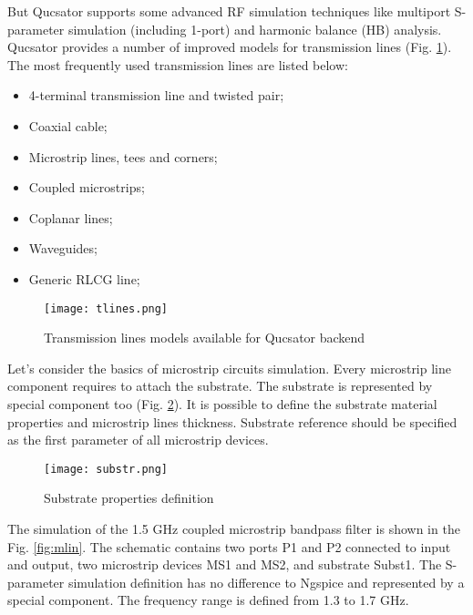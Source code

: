 But Qucsator supports some advanced RF simulation techniques like multiport S-parameter simulation (including 1-port) and harmonic balance (HB) analysis. Qucsator provides a number of improved models for transmission lines (Fig. \ref{fig:tlines}). The most frequently used transmission lines are listed below:

\begin{itemize}
 \item 4-terminal transmission line and twisted pair;
 \item Coaxial cable;
 \item Microstrip lines, tees and corners;
 \item Coupled microstrips;
 \item Coplanar lines;
 \item Waveguides;
 \item Generic RLCG line;
\end{itemize}

    \begin{figure}[!ht]
    \begin{center}
        \texttt{[image: tlines.png]}
    \end{center}
    \caption{Transmission lines models available for Qucsator backend} \label{fig:tlines}
    \end{figure}

Let's consider the basics of microstrip circuits simulation. Every microstrip line component requires to attach the substrate. The substrate is represented by special component too (Fig. \ref{fig:subst}). It is possible to define the substrate material properties and microstrip lines thickness. Substrate reference should be specified as the first parameter of all microstrip devices.

    \begin{figure}[!ht]
    \begin{center}
        \texttt{[image: substr.png]}
    \end{center}
    \caption{Substrate properties definition} \label{fig:subst}
    \end{figure}

The simulation of the 1.5 GHz coupled microstrip bandpass filter is shown in the Fig. \ref{fig:mlin}. The schematic contains two ports P1 and P2 connected to input and output, two microstrip devices MS1 and MS2, and substrate Subst1. The S-parameter simulation definition has no difference to Ngspice and represented by a special component. The frequency range is defined from 1.3 to 1.7 GHz.

